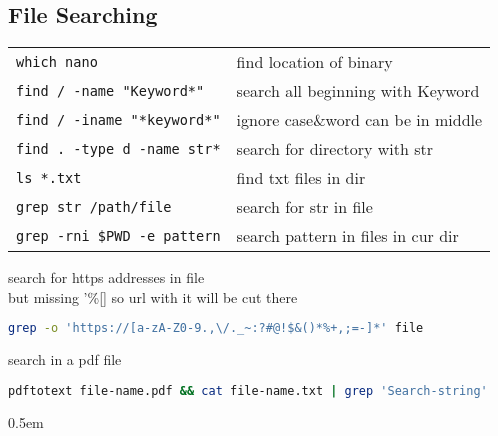 \documentclass[fontsize=6pt,paper=a4,paper=landscape,twoside=false,parskip=half,
headings=small,numbers=withenddot,usegeometry=true,english]{scrartcl}
\providecommand{\sectionbox}[1]{{\fboxsep0.5em\hspace*{-1.5\fboxsep}%
 \fcolorbox{gray}{gray!3}{%
 \parbox{\columnwidth}{%
 \raggedright #1}}}}
\begin{document}
\begin{multicols}{4}
{	\subsection{File Searching}\label{sec:filesearching}
	\begin{tabular}{@{}ll@{}}\toprule
		\texttt{which nano}  &  find location of binary\\
		\texttt{find / -name "Keyword*"}  &  search all beginning with Keyword\\
		\texttt{find / -iname "*keyword*"}  &  ignore case\&word can be in middle\\
		\texttt{find . -type d -name \textquotesingle*str*\textquotesingle}  &  search for directory with str\\
		\texttt{ls *.txt}  &  find txt files in dir\\
		\texttt{grep str /path/file}  &  search for str in file\\
		\texttt{grep -rni \$PWD -e pattern}  &  search pattern in files in cur dir\\
		\bottomrule
	\end{tabular}
	search for https addresses in file\\
	but missing '\%[] so url with it will be cut there\\
	\begin{lstlisting}[language=bash]
grep -o 'https://[a-zA-Z0-9.,\/._~:?#@!$&()*%+,;=-]*' file
	\end{lstlisting}
	search in a pdf file\\
	\begin{lstlisting}[language=bash]
pdftotext file-name.pdf && cat file-name.txt | grep 'Search-string'
	\end{lstlisting}
}

\sectionbox{
}
\end{multicols}
\end{document}
